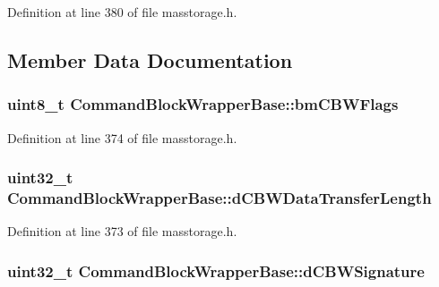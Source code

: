 \-Definition at line 380 of file masstorage.\-h.



\subsection{\-Member \-Data \-Documentation}
\hypertarget{struct_command_block_wrapper_base_a396b36ceef993c32f28b1354727a5e9e}{
\subsubsection[{bm\-C\-B\-W\-Flags}]{\setlength{\rightskip}{0pt plus 5cm}uint8\-\_\-t {\bf \-Command\-Block\-Wrapper\-Base\-::bm\-C\-B\-W\-Flags}}}\label{struct_command_block_wrapper_base_a396b36ceef993c32f28b1354727a5e9e}


\-Definition at line 374 of file masstorage.\-h.

\hypertarget{struct_command_block_wrapper_base_a62c537797107ada830b86e1f2d629164}{
\subsubsection[{d\-C\-B\-W\-Data\-Transfer\-Length}]{\setlength{\rightskip}{0pt plus 5cm}uint32\-\_\-t {\bf \-Command\-Block\-Wrapper\-Base\-::d\-C\-B\-W\-Data\-Transfer\-Length}}}\label{struct_command_block_wrapper_base_a62c537797107ada830b86e1f2d629164}


\-Definition at line 373 of file masstorage.\-h.

\hypertarget{struct_command_block_wrapper_base_a133ffc8ac9be6ce284f10efece567748}{
\subsubsection[{d\-C\-B\-W\-Signature}]{\setlength{\rightskip}{0pt plus 5cm}uint32\-\_\-t {\bf \-Command\-Block\-Wrapper\-Base\-::d\-C\-B\-W\-Signature}}}\label{struct_command_block_wrapper_base_a133ffc8ac9be6ce284f10efece567748}


